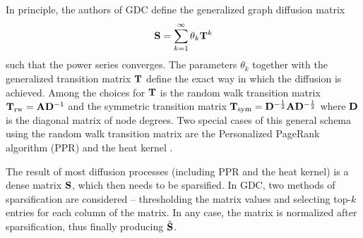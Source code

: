 In principle, the authors of GDC define the generalized graph diffusion matrix
\begin{equation}\label{eq:gdc-matrix}
    \mathbf{S} = \sum_{k = 1}^\infty \theta_k \mathbf{T}^k
\end{equation}
such that the power series converges. The parameters \( \theta_k \) together with the generalized transition matrix \( \mathbf{T} \) define the exact way in which the diffusion is achieved. Among the choices for \( \mathbf{T} \) is the random walk transition matrix \( \mathbf{T}_ \mathrm{rw} = \mathbf{A} \mathbf{D}^{-1} \) and the symmetric transition matrix \( \mathbf{T}_\mathrm{sym} = \mathbf{D}^{-\frac{1}{2}} \mathbf{A} \mathbf{D}^{-\frac{1}{2}} \) where \( \mathbf{D} \) is the diagonal matrix of node degrees. Two special cases of this general schema using the random walk transition matrix are the Personalized PageRank algorithm (PPR) \cite{page_pagerank_1999} and the heat kernel \cite{kondor_diffusion_2002}.

The result of most diffusion processes (including PPR and the heat kernel) is a dense matrix \( \mathbf{S} \), which then needs to be sparsified. In GDC, two methods of sparsification are considered -- thresholding the matrix values and selecting top-\( k \) entries for each column of the matrix. In any case, the matrix is normalized after sparsification, thus finally producing \( \hat{\mathbf{S}} \).
